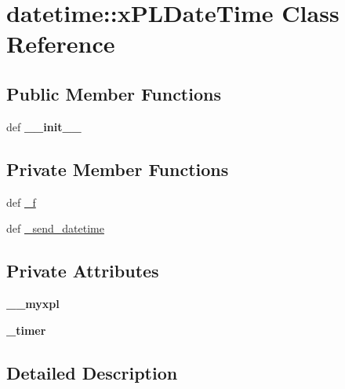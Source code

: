 \hypertarget{classdatetime_1_1xPLDateTime}{
\section{datetime::xPLDateTime Class Reference}
\label{classdatetime_1_1xPLDateTime}
}
\subsection*{Public Member Functions}
\begin{CompactItemize}
\item 
\hypertarget{classdatetime_1_1xPLDateTime_b39a3cb860ddd3595e348bc7f910f1e4}{
def \textbf{\_\-\_\-init\_\-\_\-}}
\label{classdatetime_1_1xPLDateTime_b39a3cb860ddd3595e348bc7f910f1e4}

\end{CompactItemize}
\subsection*{Private Member Functions}
\begin{CompactItemize}
\item 
def \hyperlink{classdatetime_1_1xPLDateTime_56f581af02f2f66b6b8d21fe910b9b5d}{\_\-f}
\item 
def \hyperlink{classdatetime_1_1xPLDateTime_8705cd0ed46a76dda2d82c1a87fc1b3e}{\_\-send\_\-datetime}
\end{CompactItemize}
\subsection*{Private Attributes}
\begin{CompactItemize}
\item 
\hypertarget{classdatetime_1_1xPLDateTime_1b15c71df12789d777f44dc8d39e48f9}{
\textbf{\_\-\_\-myxpl}}
\label{classdatetime_1_1xPLDateTime_1b15c71df12789d777f44dc8d39e48f9}

\item 
\hypertarget{classdatetime_1_1xPLDateTime_7d66e43fe5cd70d3e9c8a90ae406dcc7}{
\textbf{\_\-timer}}
\label{classdatetime_1_1xPLDateTime_7d66e43fe5cd70d3e9c8a90ae406dcc7}

\end{CompactItemize}


\subsection{Detailed Description}


